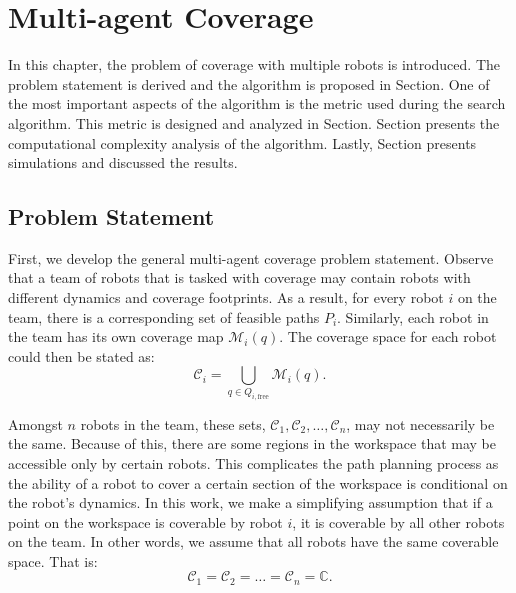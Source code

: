 \documentclass[../main.tex]{subfiles}
\begin{document}
\chapter{Multi-agent Coverage}
\label{chapter:multi_agent_coverage}

In this chapter, the problem of coverage with multiple robots is introduced. The problem statement is derived and the algorithm is proposed in Section. One of the most important aspects of the algorithm is the metric used during the search algorithm. This metric is designed and analyzed in Section. Section presents the computational complexity analysis of the algorithm. Lastly, Section presents simulations and discussed the results.


\section{Problem Statement}
\label{section:multi_agent_problem_statement}

First, we develop the general multi-agent coverage problem statement. Observe that a team of robots that is tasked with coverage may contain robots with different dynamics and coverage footprints. As a result, for every robot $i$ on the team, there is a corresponding set of feasible paths $P_i$. Similarly, each robot in the team has its own coverage map $\mathcal{M}_i(q)$. The coverage space for each robot could then be stated as:
\begin{equation}
	\mathcal{C}_i=\bigcup_{q\in Q_{i,\text{free}}}\mathcal{M}_i(q).
\end{equation}

Amongst $n$ robots in the team, these sets, $\mathcal{C}_1, \mathcal{C}_2,\ldots,\mathcal{C}_n$, may not necessarily be the same. Because of this, there are some regions in the workspace that may be accessible only by certain robots. This complicates the path planning process as the ability of a robot to cover a certain section of the workspace is conditional on the robot's dynamics. In this work, we make a simplifying assumption that if a point on the workspace is coverable by robot $i$, it is coverable by all other robots on the team. In other words, we assume that all robots have the same coverable space. That is:
\begin{equation}
	\mathcal{C}_1=\mathcal{C}_2=\ldots=\mathcal{C}_n=\mathbb{C}.
\end{equation}

\end{document}
